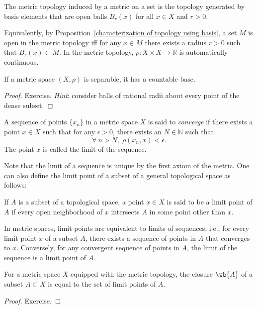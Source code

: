 \begin{defn}
    The metric topology induced by a metric on a set is the topology generated by basis elements that are open balls $B_r(x)$ for all $x\in X$ and $r>0$. 
\end{defn}
\begin{rem}
    Equivalently, by Proposition~\ref{characterization of topology using basis}, a set $M$ is open in the metric topology iff for any $x\in M$ there exists a radius $r>0$ such that $B_r(x)\subset M$. In the metric topology, $\rho:X\times X\to \mathbb R$ is automatically continuous.
\end{rem}
\begin{prop}
    If a metric space $(X,\rho)$ is separable, it has a countable base.
\end{prop}
\begin{proof}
    Exercise. \emph{Hint}: consider balls of rational radii about every point of the dense subset.
\end{proof}

\begin{defn}
    A sequence of points $\{x_n\}$ in a metric space $X$ is said to \emph{converge} if there exists a point $x\in X$ such that for any $\epsilon >0$, there exists an $N\in \mathbb{N}$ such that
    \begin{equation}
        \forall ~ n>N,\; \rho(x_n,x) < \epsilon.
    \end{equation}
    The point $x$ is called the limit of the sequence.
\end{defn}
Note that the limit of a sequence is unique by the first axiom of the metric. One can also define the limit point of a subset of a general topological space as follows:
\begin{defn}
    If $A$ is a subset of a topological space, a point $x\in X$ is said to be a limit point of $A$ if every open neighborhood of $x$ intersects $A$ in some point other than $x$.
\end{defn}

In metric spaces, limit points are equivalent to limits of sequences, i.e., for every limit point $x$ of a subset $A$, there exists a sequence of points in $A$ that converges to $x$. Conversely, for any convergent sequence of points in $A$, the limit of the sequence is a limit point of $A$.

\begin{prop}
    For a metric space $X$ equipped with the metric topology, the closure $\wb{A}$ of a subset $A\subset X$ is equal to the set of limit points of $A$.
\end{prop}
\begin{proof}
    Exercise.
\end{proof}

